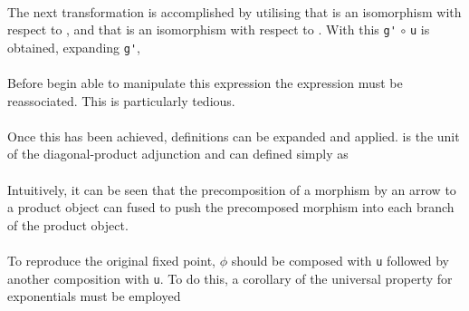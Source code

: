 \begin{AgdaMultiCode}
\\
The next transformation is accomplished by utilising that 
is an isomorphism with respect to , and that
 is an isomorphism with respect to
. With this \verb|g'| $\circ$ \verb|u| is obtained,
expanding \verb|g'|, \\
\\
Before begin able to manipulate this expression the expression must be
reassociated. This is particularly tedious.\\

\\
Once this has been achieved, definitions can be expanded and applied.
\AgdaFunction{$\delta$} is the unit of the diagonal-product adjunction and can
defined simply as \\
 \\
Intuitively, it can be seen that the precomposition of a morphism by an arrow to
a product object can fused to push the precomposed morphism into each branch of
the product object.
\\
 \\
To reproduce the original fixed point, $\phi$ should be composed with \verb|u|
followed by another composition with \verb|u|. To do this, a corollary of the
universal property for exponentials must be employed \\

\\


\end{AgdaMultiCode}
